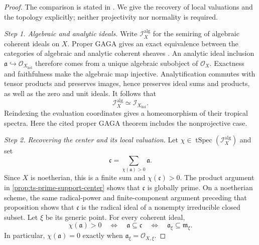 \begin{proof}
The comparison is stated in
\cite[Example~1.3.2(1) and Remark~1.3.3]{MPTropicalV2}.
We give the recovery of local valuations and the topology explicitly;
neither projectivity nor normality is required.

\emph{Step 1. Algebraic and analytic ideals.}
Write $\mathscr I_X^{\mathrm{alg}}$ for the semiring of algebraic
coherent ideals on $X$.
Proper GAGA gives an exact equivalence between the categories of
algebraic and analytic coherent sheaves
\cite[Expos\'e~XII, Proposition~1.3.1 and Theorem~4.4]{SGA1Reprint}.
An analytic ideal inclusion $\mathfrak a\hookrightarrow
\mathcal O_{X_{\mathrm{hol}}}$ therefore comes from a unique
algebraic subobject of $\mathcal O_X$. Exactness and faithfulness
make the algebraic map injective. Analytification commutes with
tensor products and preserves images, hence preserves ideal sums
and products, as well as the zero and unit ideals. It follows that
\[
 \mathscr I_X^{\mathrm{alg}}\simeq\mathscr I_{X_{\mathrm{hol}}}.
\]
Reindexing the evaluation coordinates gives a homeomorphism of
their tropical spectra. Here the cited proper GAGA theorem includes
the nonprojective case.

\emph{Step 2. Recovering the center and its local valuation.}
Let $\chi\in\operatorname{tSpec}(\mathscr I_X^{\mathrm{alg}})$ and set
\[
                 \mathfrak c=\sum_{\chi(\mathfrak a)>0}\mathfrak a.
\]
Since $X$ is noetherian, this is a finite sum and
$\chi(\mathfrak c)>0$. The product argument in
\cref{prop:ts-prime-support-center} shows that $\mathfrak c$ is
globally prime. On a noetherian scheme, the same radical-power and
finite-component argument preceding that proposition shows that
$\mathfrak c$ is the radical ideal of a nonempty irreducible closed
subset. Let $\xi$ be its generic point. For every coherent ideal,
\[
 \chi(\mathfrak a)>0
 \quad\Longleftrightarrow\quad
 \mathfrak a\subseteq\mathfrak c
 \quad\Longleftrightarrow\quad
 \mathfrak a_\xi\subseteq\mathfrak m_\xi.
\]
In particular, $\chi(\mathfrak a)=0$ exactly when
$\mathfrak a_\xi=\mathcal O_{X,\xi}$.


\end{proof}
